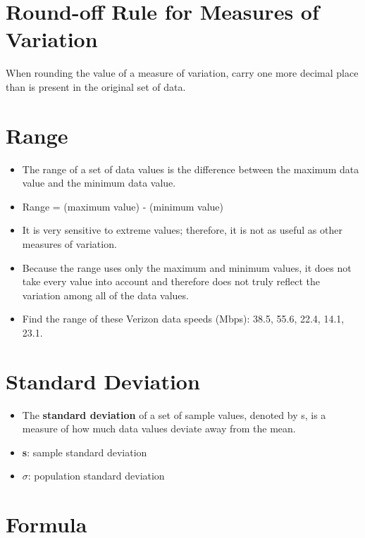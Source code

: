 \documentclass[]{book}
\providecommand{\tightlist}{%
  \setlength{\itemsep}{0pt}\setlength{\parskip}{0pt}}
\begin{document}
\hypertarget{round-off-rule-for-measures-of-variation}{%
\section{Round-off Rule for Measures of Variation}\label{round-off-rule-for-measures-of-variation}}

When rounding the value of a measure of variation, carry one more decimal place than is present in the original set of data.

\hypertarget{range}{%
\section{Range}\label{range}}

\begin{itemize}
\tightlist
\item
  The range of a set of data values is the difference between the maximum data value and the minimum data value.
\item
  Range = (maximum value) - (minimum value)
\item
  It is very sensitive to extreme values; therefore, it is not as useful as other measures of variation.
\item
  Because the range uses only the maximum and minimum values, it does not take every value into account and therefore does not truly reflect the variation among all of the data values.
\item
  Find the range of these Verizon data speeds (Mbps): 38.5, 55.6, 22.4, 14.1, 23.1.
\end{itemize}

\hypertarget{standard-deviation}{%
\section{Standard Deviation}\label{standard-deviation}}

\begin{itemize}
\tightlist
\item
  The \textbf{standard deviation} of a set of sample values, denoted by s, is a measure of how much data values deviate away from the mean.
\item
  \textbf{s}: sample standard deviation
\item
  \(\sigma\): population standard deviation
\end{itemize}

\hypertarget{formula}{%
\section{Formula}\label{formula}}
\end{document}
